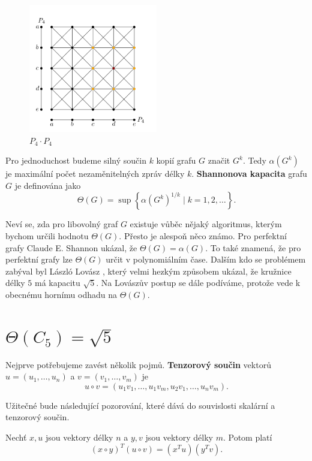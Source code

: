 \begin{figure}[h!]
    \centering
    \includegraphics[width=0.5\textwidth]{img/strong_product_P4_P4.png}   
    \caption{$P_4 \cdot P_4$}
    \label{fig:strong_product_P4_P4}
\end{figure}

Pro jednoduchost budeme silný součin $k$ kopií grafu $G$ značit $G^k$. Tedy $\alpha(G^k)$ je maximální počet nezaměnitelných zpráv délky $k$. \textbf{Shannonova kapacita} grafu $G$ je definována jako
$$
    \Theta(G) = \sup \left\{ \alpha(G^k)^{1/k} \mid k = 1, 2, \dots \right\}.
$$

Neví se, zda pro libovolný graf $G$ existuje vůběc nějaký algoritmus, kterým bychom určili hodnotu $\Theta(G)$. Přesto je alespoň něco známo. Pro perfektní grafy Claude E. Shannon \cite{shannon} ukázal, že $\Theta(G) = \alpha(G)$. To také znamená, že pro perfektní grafy lze $\Theta(G)$ určit v polynomiálním čase. Dalším kdo se problémem zabýval byl László Lovász \cite{lovasz}, který velmi hezkým způsobem ukázal, že kružnice délky $5$ má kapacitu $\sqrt{5}$. Na Lovászův postup se dále podíváme, protože vede k obecnému hornímu odhadu na $\Theta(G)$.

\section{$\Theta(C_5) = \sqrt{5}$}

Nejprve potřebujeme zavést několik pojmů. \textbf{Tenzorový součin} vektorů $u = \left(u_1, \dots, u_n \right)$ a $v = \left(v_1, \dots, v_m \right)$ je
$$
    u \circ v = \left( u_1 v_1, \dots, u_1 v_m, u_2 v_1, \dots, u_n v_m \right).
$$

Užitečné bude následující pozorování, které dává do souvislosti skalární a tenzorový součin.

\begin{pz}
    Nechť $x, u$ jsou vektory délky $n$ a $y, v$ jsou vektory délky $m$. Potom platí
    \begin{equation}
        \left( x \circ y \right)^T \left( u \circ v \right) = \left( x^T u \right) \left( y^T v \right).
        \label{eq:tensor_scalar_product}
    \end{equation}
\end{pz}

